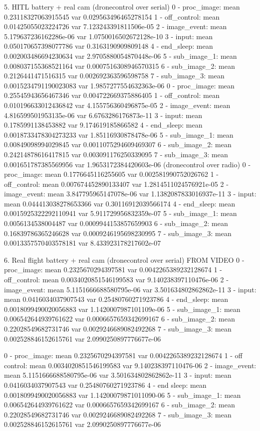 5. HITL battery + real cam 
        (dronecontrol over serial)
0 - proc_image: mean 0.23118327063915545 var 0.029563496465278154
1 - off_control: mean 0.01425055023224726 var 7.123243391811506e-05
2 - image_event: mean 5.179637236162286e-06 var 1.0750016502672128e-10
3 - input: mean 0.050170657398077786 var 0.3163190909809148
4 - end_sleep: mean 0.002003486694230634 var 2.9705880054870448e-06
5 - sub_image_1: mean 0.008037155368521164 var 0.0007516308946570315
6 - sub_image_2: mean 0.2126441471516315 var 0.002692363596598758
7 - sub_image_3: mean 0.0015234791190023083 var 1.9857277554632363e-06
0 - proc_image: mean 0.25545943656467346 var 0.004722669375886405
1 - off_control: mean 0.010196633012436842 var 4.155756360496875e-05
2 - image_event: mean 4.816599501953135e-06 var 6.6763286176873e-11
3 - input: mean 0.1785991138453882 var 9.174619185866582
4 - end_sleep: mean 0.0018733478304273233 var 1.85116930878478e-06
5 - sub_image_1: mean 0.00849098994029845 var 0.0011075294609469307
6 - sub_image_2: mean 0.24214878616417815 var 0.003091176250339095
7 - sub_image_3: mean 0.001651787385569956 var 1.9653172384420603e-06
         (dronecontrol over radio)
0 - proc_image: mean 0.1776645116255605 var 0.002581990752026762
1 - off_control: mean 0.007674452890133407 var 1.2814511024576921e-05
2 - image_event: mean 3.847795965147078e-06 var 1.1382087833016937e-11
3 - input: mean 0.044413038278653366 var 0.30116912039566174
4 - end_sleep: mean 0.0015925322292110941 var 5.911729956832359e-07
5 - sub_image_1: mean 0.0056134538004487 var 0.0009944153857659903
6 - sub_image_2: mean 0.16839786365246628 var 0.0009246195698230995
7 - sub_image_3: mean 0.0013357570403578181 var 8.433923178217602e-07



6. Real flight battery + real cam (dronecontrol over serial)
FROM VIDEO
0 - proc_image: mean 0.2325670294397581 var 0.0042265389232128674
1 - off_control: mean 0.0034020851546199583 var 9.140238397110476e-06
2 - image_event: mean 5.1151666688580795e-06 var 3.501634802862862e-11
3 - input: mean 0.0416034037907543 var 0.25480760271923786
4 - end_sleep: mean 0.0018099490020056883 var 1.1420007987101109e-06
5 - sub_image_1: mean 0.006542644939761622 var 0.0006657659342699167
6 - sub_image_2: mean 0.22028549682731746 var 0.0029246689082492268
7 - sub_image_3: mean 0.002528846152615761 var 2.0990250897776677e-06


0 - proc_image: mean 0.2325670294397581 var 0.0042265389232128674 
1 - off control: mean 0.0034020851546199583 var 9.140238397110476-06
2 - image_event: mean 5.1151666688580795e-06 var 3.501634802862862e-11
3 - input: mean 0.0416034037907543 var 0.25480760271923786
4 - end sleep: mean 0.0018099490020056883 var 1.14200079871011090-06
5 - sub_image_1: mean 0.006542644939761622 var 0.0006657659342699167 
6 - sub_image_2: mean 0.22028549682731746 var 0.0029246689082492268
7 - sub_image_3: mean 0.002528846152615761 var 2.0990250897776677e-06